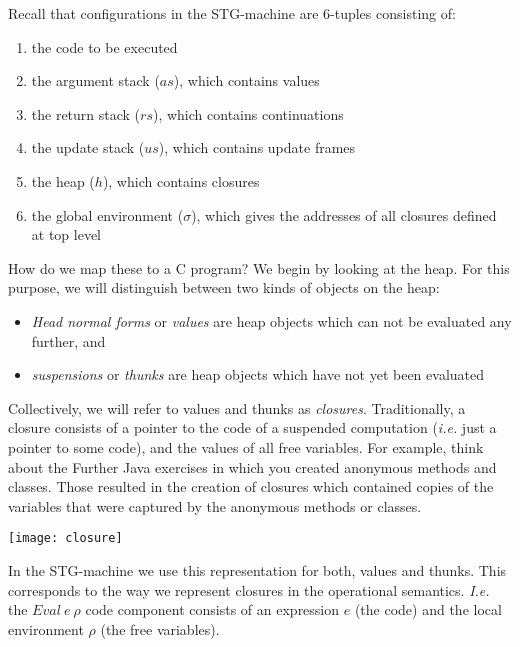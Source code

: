 \documentclass[10pt,a4paper]{exam} %
\begin{document}
\begin{questions}
\question  Recall that configurations in the STG-machine are 6-tuples consisting of:
\begin{enumerate}
	\item the code to be executed
	\item the argument stack ($\mathit{as}$), which contains values
	\item the return stack ($\mathit{rs}$), which contains continuations
	\item the update stack ($\mathit{us}$), which contains update frames
	\item the heap ($h$), which contains closures
	\item the global environment ($\sigma$), which gives the addresses of all closures defined at top level
\end{enumerate}
How do we map these to a C program? We begin by looking at the heap. For this purpose, we will distinguish between two kinds of objects on the heap:
\begin{itemize}
	\item \emph{Head normal forms} or \emph{values} are heap objects which can not be evaluated any further, and
	\item \emph{suspensions} or \emph{thunks} are heap objects which have not yet been evaluated
\end{itemize}
Collectively, we will refer to values and thunks as \emph{closures}. Traditionally, a closure consists of a pointer to the code of a suspended computation (\emph{i.e.} just a pointer to some code), and the values of all free variables. For example, think about the Further Java exercises in which you created anonymous methods and classes. Those resulted in the creation of closures which contained copies of the variables that were captured by the anonymous methods or classes. 
\begin{center}
\texttt{[image: closure]}
\end{center}
In the STG-machine we use this representation for both, values and thunks. This corresponds to the way we represent closures in the operational semantics. \emph{I.e.} the $\mathit{Eval}~e~\rho$ code component consists of an expression $e$ (the code) and the local environment $\rho$ (the free variables). 
\begin{parts}

\end{parts}
\end{questions}
\end{document}
